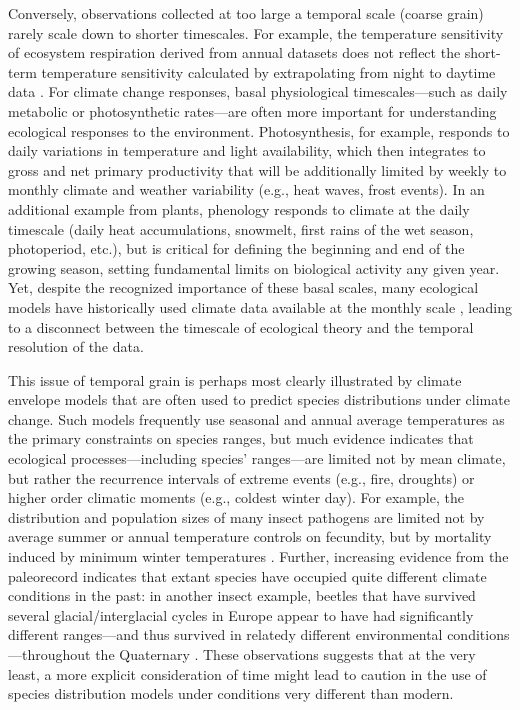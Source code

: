 \documentclass[11pt,a4paper,oneside]{article}
\begin{document}
Conversely, observations collected at too large a temporal scale (coarse grain) rarely scale down to shorter timescales. For example, the temperature sensitivity of ecosystem respiration derived from annual datasets does not reflect the short-term temperature sensitivity calculated by extrapolating from night to daytime data \citep{Reichstein2005}. For climate change responses, basal physiological timescales---such as daily metabolic or photosynthetic rates---are often more important for understanding ecological responses to the environment. Photosynthesis, for example, responds to daily variations in temperature and light availability, which then integrates to gross and net primary productivity that will be additionally limited by weekly to monthly climate and weather variability (e.g., heat waves, frost events).  In an additional example from plants, phenology responds to climate at the daily timescale (daily heat accumulations, snowmelt, first rains of the wet season, photoperiod, etc.), but is critical for defining the beginning and end of the growing season, setting fundamental limits on biological activity any given year. Yet, despite the recognized importance of these basal scales, many ecological models have historically used climate data available at the monthly scale \citep{Sitch2003}, leading to a disconnect between the timescale of ecological theory and the temporal resolution of the data.

This issue of temporal grain is perhaps most clearly illustrated by climate envelope models that are often used to predict species distributions under climate change. Such models frequently use seasonal and annual average temperatures as the primary constraints on species ranges, but much evidence indicates that ecological processes---including species' ranges---are limited not by mean climate, but rather the recurrence intervals of extreme events (e.g., fire, droughts) or higher order climatic moments (e.g., coldest winter day). For example, the distribution and population sizes of many insect pathogens are limited not by average summer or annual temperature controls on fecundity, but by mortality induced by minimum winter temperatures \citep{weed2013}. Further, increasing evidence from the paleorecord indicates that extant species have occupied quite different climate conditions in the past: in another insect example, beetles that have survived several glacial/interglacial cycles in Europe appear to have had significantly different ranges---and thus survived in relatedy different environmental conditions---throughout the Quaternary \citep{Abellan2011}. These observations suggests that at the very least, a more explicit consideration of time might lead to caution in the use of species distribution models under conditions very different than modern. 
\end{document}
